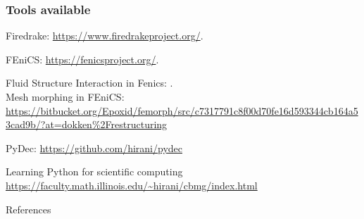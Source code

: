 \documentclass{beamer}
\begin{document}
\begin{frame}\frametitle{Tools available}
	Firedrake: \url{https://www.firedrakeproject.org/}. \\
	\vspace{.1cm}
	
	FEniCS: \url{https://fenicsproject.org/}. \\
	\vspace{.1cm}
	
	Fluid Structure Interaction in Fenics: \cite{bergersen2020fenics}. \\
	\vspace{.1cm}
	Mesh morphing in FEniCS: \url{https://bitbucket.org/Epoxid/femorph/src/c7317791c8f00d70fe16d593344cb164a53cad9b/?at=dokken\%2Frestructuring} \\
	\vspace{.1cm}	
	
	PyDec: \url{https://github.com/hirani/pydec} \\
	\vspace{.1cm}
	
	Learning Python for scientific computing \url{https://faculty.math.illinois.edu/~hirani/cbmg/index.html}
\end{frame}


\begin{frame}[allowframebreaks]{References}
	\printbibliography
	\nocite{*}
\end{frame}
\end{document}
